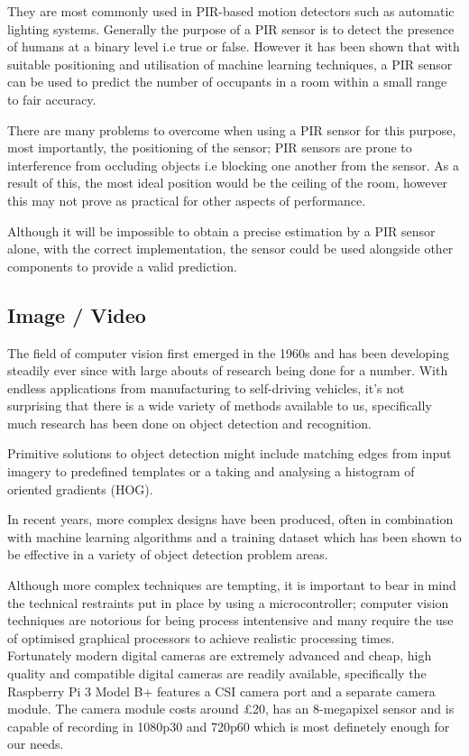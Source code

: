 \documentclass{l4proj}
\begin{document}
They are most commonly used in PIR-based motion detectors such as automatic lighting systems. Generally the purpose of a PIR sensor is to detect the presence of humans at a binary level i.e true or false. However it has been shown that with suitable positioning and utilisation of machine learning techniques, a PIR sensor can be used to predict the number of occupants in a room within a small range to fair accuracy.

There are many problems to overcome when using a PIR sensor for this purpose, most importantly, the positioning of the sensor; PIR sensors are prone to interference from occluding objects i.e blocking one another from the sensor. As a result of this, the most ideal position would be the ceiling of the room, however this may not prove as practical for other aspects of performance.

Although it will be impossible to obtain a precise estimation by a PIR sensor alone, with the correct implementation, the sensor could be used alongside other components to provide a valid prediction.

\subsection{Image / Video}
The field of computer vision first emerged in the 1960s and has been developing steadily ever since with large abouts of research being done for a number. With endless applications from manufacturing to self-driving vehicles, it’s not surprising that there is a wide variety of methods available to us, specifically much research has been done on object detection and recognition. 

Primitive solutions to object detection might include matching edges from input imagery to predefined templates or a taking and analysing a histogram of oriented gradients (HOG). 

In recent years, more complex designs have been produced, often in combination with machine learning algorithms and a training dataset which has been shown to be effective in a variety of object detection problem areas. 

Although more complex techniques are tempting, it is important to bear in mind the technical restraints put in place by using a microcontroller; computer vision techniques are notorious for being process intentensive and many require the use of optimised graphical processors to achieve realistic processing times. Fortunately modern digital cameras are extremely advanced and cheap, high quality and compatible digital cameras are readily available, specifically the Raspberry Pi 3 Model B+ features a CSI camera port and a separate camera module. The camera module costs around £20, has an 8-megapixel sensor and is capable of recording in 1080p30 and 720p60 which is most definetely enough for our needs.
\end{document}

